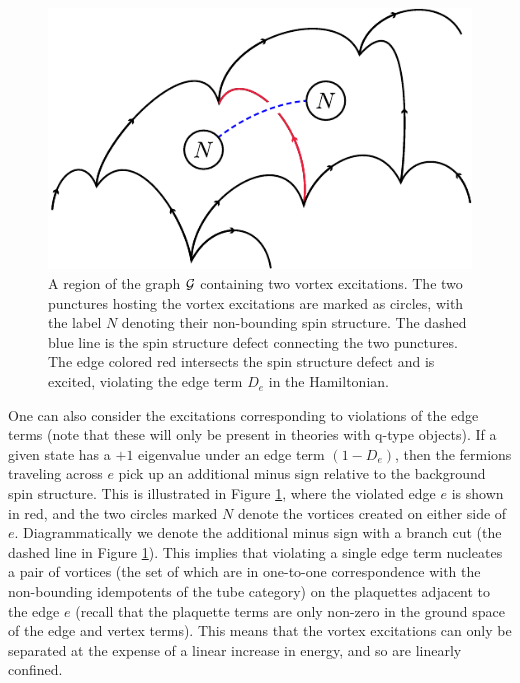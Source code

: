 \begin{figure}
\begin{center}
\includegraphics{graph_with_edge_excitationprime.pdf}
\caption{\label{lattice_w_vortices} A region of the graph $\mathcal{G}$ containing two vortex excitations. 
The two punctures hosting the vortex excitations are marked as circles, with the label $N$ denoting their non-bounding spin structure. 
The dashed blue line is the spin structure defect connecting the two punctures.
The edge colored red intersects the spin structure defect and is excited, violating the edge term $D_e$ in the Hamiltonian. 
}
\end{center}
\end{figure}

One can also consider the excitations corresponding to violations of the edge terms 
(note that these will only be present in theories with q-type objects).
If a given state has a $+1$ eigenvalue under an edge term $(1-D_e)$, 
then the fermions traveling across $e$ pick up an additional minus sign relative to the background spin structure.
This is illustrated in Figure \ref{lattice_w_vortices}, where the violated edge $e$ is shown in red, and the two circles marked $N$ denote the vortices created on either side of $e$. 
Diagrammatically we denote the additional minus sign with a branch cut (the dashed line in Figure \ref{lattice_w_vortices}).
This implies that violating a single edge term nucleates a pair of vortices (the set of which are in one-to-one correspondence with the non-bounding idempotents of the tube category) on the plaquettes adjacent to the edge $e$ (recall that the plaquette terms are only non-zero in the ground space of the edge and vertex terms).
This means that the vortex excitations can only be separated
at the expense of a linear increase in energy, and so are linearly confined. 





